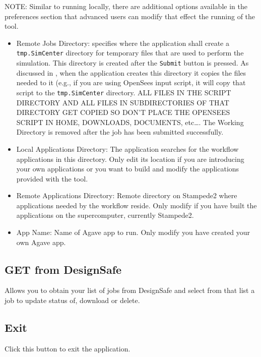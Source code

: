 NOTE: Similar to running locally, there are additional options available in the preferences
 section that advanced users can modify that effect the running of the tool.
\begin{itemize}
\item Remote Jobs Directory: specifies where the \texttt{\getsoftwarename{}} application shall
create a \texttt{tmp.SimCenter} directory for temporary files that are used to perform the simulation. This directory is created after the \texttt{Submit} button is pressed. As discussed in , when
the application creates this directory it copies the files needed to it (e.g., if you are using OpenSees input script, it
will copy that script to the \texttt{tmp.SimCenter} directory. ALL FILES IN
THE SCRIPT DIRECTORY AND ALL FILES IN SUBDIRECTORIES OF THAT DIRECTORY GET
COPIED SO DON’T PLACE THE OPENSEES SCRIPT IN HOME, DOWNLOADS, DOCUMENTS, etc…. The Working Directory is removed after the job has been submitted successfully.
\item Local Applications Directory: The \texttt{\getsoftwarename{}} application searches for the workflow applications in this directory. Only edit its location if you are introducing your own applications or you want to build and modify the 
applications provided with the tool. 
\item Remote Applications Directory: Remote directory on Stampede2 where applications needed by the workflow reside. Only modify if you have built the applications on the supercomputer, currently Stampede2.
\item App Name: Name of Agave app to run. Only modify you have created your own Agave app.
\end{itemize}

\subsection{GET from DesignSafe}
Allows you to obtain your list of jobs from DesignSafe and select from that list a job to update status of, download or delete.

\subsection{Exit}
Click this button to exit the application.
